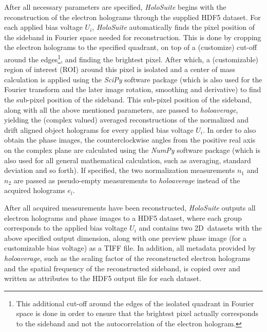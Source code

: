 After all necessary parameters are specified, \emph{HoloSuite} begins with the reconstruction of the electron holograms through the supplied HDF5 dataset. For each applied bias voltage $U_i$, \emph{HoloSuite} automatically finds the pixel position of the sideband in Fourier space needed for reconstruction. This is done by cropping the electron holograms to the specified quadrant, on top of a (customize) cut-off around the edges\footnote{This additional cut-off around the edges of the isolated quadrant in Fourier space is done in order to ensure that the brightest pixel actually corresponds to the sideband and not the autocorrelation of the electron hologram.}, and finding the brightest pixel. After which, a (customizable) region of interest (ROI) around this pixel is isolated and a center of mass calculation is applied using the \emph{SciPy} software package \cite{Virtanen2020} (which is also used for the Fourier transform and the later image rotation, smoothing and derivative) to find the sub-pixel position of the sideband. This sub-pixel position of the sideband, along with all the above mentioned parameters, are passed to \emph{holoaverage}, yielding the (complex valued) averaged reconstructions of the normalized and drift aligned object holograms for every applied bias voltage $U_i$. In order to also obtain the phase images, the counterclockwise angles from the positive real axis on the complex plane are calculated using the \emph{NumPy} software package \cite{Harris2020} (which is also used for all general mathematical calculation, such as averaging, standard deviation and so forth). If specified, the two normalization measurements $n_1$ and $n_2$ are passed as pseudo-empty measurements to \emph{holoaverage} instead of the acquired holograms $e_l$.

After all acquired measurements have been reconstructed, \emph{HoloSuite} outputs all electron holograms and phase images to a HDF5 dataset, where each group corresponds to the applied bias voltage $U_i$ and contains two 2D~datasets with the above specified output dimension, along with one preview phase image (for a customizable bias voltage) as a TIFF file. In addition, all metadata provided by \emph{holoaverage}, such as the scaling factor of the reconstructed electron holograms and the spatial frequency of the reconstructed sideband, is copied over and written as attributes to the HDF5 output file for each dataset.

